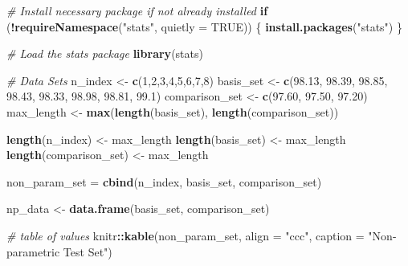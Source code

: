 \documentclass[
  12pt,
  a4paper,
]{article}
\newenvironment{Shaded}{\begin{snugshade}}{\end{snugshade}}
\newcommand{\AttributeTok}[1]{\textcolor[rgb]{0.13,0.29,0.53}{#1}}
\newcommand{\CommentTok}[1]{\textcolor[rgb]{0.56,0.35,0.01}{\textit{#1}}}
\newcommand{\ConstantTok}[1]{\textcolor[rgb]{0.56,0.35,0.01}{#1}}
\newcommand{\ControlFlowTok}[1]{\textcolor[rgb]{0.13,0.29,0.53}{\textbf{#1}}}
\newcommand{\DecValTok}[1]{\textcolor[rgb]{0.00,0.00,0.81}{#1}}
\newcommand{\FloatTok}[1]{\textcolor[rgb]{0.00,0.00,0.81}{#1}}
\newcommand{\FunctionTok}[1]{\textcolor[rgb]{0.13,0.29,0.53}{\textbf{#1}}}
\newcommand{\NormalTok}[1]{#1}
\newcommand{\OtherTok}[1]{\textcolor[rgb]{0.56,0.35,0.01}{#1}}
\newcommand{\SpecialCharTok}[1]{\textcolor[rgb]{0.81,0.36,0.00}{\textbf{#1}}}
\newcommand{\StringTok}[1]{\textcolor[rgb]{0.31,0.60,0.02}{#1}}
\numberwithin{equation}{section}
\theoremstyle{plain}
\theoremstyle{definition}
\theoremstyle{remark}
\theoremstyle{note}
\begin{document}
\begin{Shaded}
\begin{Highlighting}[]
\CommentTok{\# Install necessary package if not already installed}
\ControlFlowTok{if}\NormalTok{ (}\SpecialCharTok{!}\FunctionTok{requireNamespace}\NormalTok{(}\StringTok{"stats"}\NormalTok{, }\AttributeTok{quietly =} \ConstantTok{TRUE}\NormalTok{)) \{}
    \FunctionTok{install.packages}\NormalTok{(}\StringTok{"stats"}\NormalTok{)}
\NormalTok{\}}

\CommentTok{\# Load the stats package}
\FunctionTok{library}\NormalTok{(stats)}

\CommentTok{\# Data Sets}
\NormalTok{n\_index }\OtherTok{\textless{}{-}} \FunctionTok{c}\NormalTok{(}\DecValTok{1}\NormalTok{,}\DecValTok{2}\NormalTok{,}\DecValTok{3}\NormalTok{,}\DecValTok{4}\NormalTok{,}\DecValTok{5}\NormalTok{,}\DecValTok{6}\NormalTok{,}\DecValTok{7}\NormalTok{,}\DecValTok{8}\NormalTok{)}
\NormalTok{basis\_set }\OtherTok{\textless{}{-}} \FunctionTok{c}\NormalTok{(}\FloatTok{98.13}\NormalTok{, }\FloatTok{98.39}\NormalTok{, }\FloatTok{98.85}\NormalTok{, }\FloatTok{98.43}\NormalTok{, }\FloatTok{98.33}\NormalTok{, }\FloatTok{98.98}\NormalTok{, }\FloatTok{98.81}\NormalTok{, }\FloatTok{99.1}\NormalTok{)}
\NormalTok{comparison\_set }\OtherTok{\textless{}{-}} \FunctionTok{c}\NormalTok{(}\FloatTok{97.60}\NormalTok{, }\FloatTok{97.50}\NormalTok{, }\FloatTok{97.20}\NormalTok{)}
\NormalTok{max\_length }\OtherTok{\textless{}{-}} \FunctionTok{max}\NormalTok{(}\FunctionTok{length}\NormalTok{(basis\_set), }\FunctionTok{length}\NormalTok{(comparison\_set))}

\FunctionTok{length}\NormalTok{(n\_index) }\OtherTok{\textless{}{-}}\NormalTok{ max\_length}
\FunctionTok{length}\NormalTok{(basis\_set) }\OtherTok{\textless{}{-}}\NormalTok{ max\_length                      }
\FunctionTok{length}\NormalTok{(comparison\_set) }\OtherTok{\textless{}{-}}\NormalTok{ max\_length }

\NormalTok{non\_param\_set }\OtherTok{=} \FunctionTok{cbind}\NormalTok{(n\_index, basis\_set, comparison\_set)}

\NormalTok{np\_data }\OtherTok{\textless{}{-}} \FunctionTok{data.frame}\NormalTok{(basis\_set, comparison\_set) }
\end{Highlighting}
\end{Shaded}

\newpage

\begin{Shaded}
\begin{Highlighting}[]
\CommentTok{\# table of values}
\NormalTok{knitr}\SpecialCharTok{::}\FunctionTok{kable}\NormalTok{(non\_param\_set, }\AttributeTok{align =} \StringTok{"ccc"}\NormalTok{, }\AttributeTok{caption =} \StringTok{"Non{-}parametric Test Set"}\NormalTok{)}
\end{Highlighting}
\end{Shaded}
\end{document}
